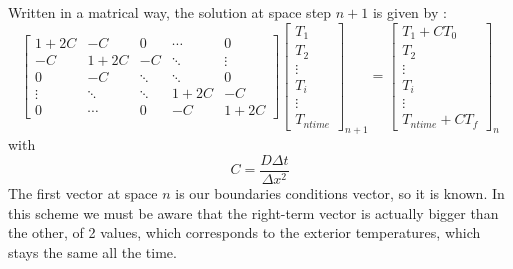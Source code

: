 \documentclass{article}
\begin{document}
                    Written in a matrical way, the solution at space step $n+1$ is given by :
                    \begin{equation}
                        \label{eq:laas}
                        \begin{bmatrix}
                            1+2C   & -C     & 0      & \cdots & 0 \\
                            -C     & 1+2C   & -C     & \ddots & \vdots \\
                            0      & -C     & \ddots & \ddots & 0 \\
                            \vdots & \ddots & \ddots & 1+2C   & -C\\
                            0      & \cdots & 0      & -C     & 1+2C
                        \end{bmatrix}
                        \begin{bmatrix}
                            T_{1} \\
                            T_{2} \\
                            \vdots \\
                            T_{i} \\
                            \vdots \\
                            T_{ntime}
                        \end{bmatrix}_{n+1}
                        =
                        \begin{bmatrix}
                            T_{1} + CT_{0}\\
                            T_{2} \\
                            \vdots \\
                            T_{i} \\
                            \vdots \\
                            T_{ntime} + CT_{f}
                        \end{bmatrix}_{n}
                    \end{equation}
                    with $$C = \frac{D\Delta t}{\Delta x ^2}  $$ 
                    The first vector at space $n$ is our boundaries conditions vector, so it is known.
                    In this scheme we must be aware that the right-term vector is actually bigger than
                    the other, of 2 values, which corresponds to the exterior temperatures, which stays
                    the same all the time.\\
\end{document}

